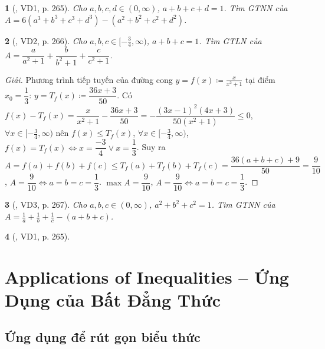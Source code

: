 \documentclass{article}
\newtheorem{baitoan}{}
\begin{document}
\begin{baitoan}[\cite{Khai_Huong_bdt}, VD1, p. 265]
	Cho $a,b,c,d\in(0,\infty)$, $a + b + c + d = 1$. Tìm {\rm GTNN} của $A = 6(a^3 + b^3 + c^3 + d^3) - (a^2 + b^2 + c^2 + d^2)$.
\end{baitoan}

\begin{baitoan}[\cite{Khai_Huong_bdt}, VD2, p. 266]
	Cho $a,b,c\in[-\frac{3}{4},\infty)$, $a + b + c = 1$. Tìm {\rm GTLN} của $A = \dfrac{a}{a^2 + 1} + \dfrac{b}{b^2 + 1} + \dfrac{c}{c^2 + 1}$.
\end{baitoan}

\begin{proof}[Giải]
	Phương trình tiếp tuyến của đường cong $y = f(x)\coloneqq\frac{x}{x^2 + 1}$ tại điểm $x_0 = \dfrac{1}{3}$: $y = T_f(x)\coloneqq\dfrac{36x + 3}{50}$. Có $f(x) - T_f(x) = \dfrac{x}{x^2 + 1} - \dfrac{36x + 3}{50} = -\dfrac{(3x - 1)^2(4x + 3)}{50(x^2 + 1)}\le0$, $\forall x\in[-\frac{3}{4},\infty)$ nên $f(x)\le T_f(x)$, $\forall x\in[-\frac{3}{4},\infty)$, $f(x) = T_f(x)\Leftrightarrow x = \dfrac{-3}{4}\lor x = \dfrac{1}{3}$. Suy ra $A = f(a) + f(b) + f(c)\le T_f(a) + T_f(b) + T_f(c) = \dfrac{36(a + b + c) + 9}{50} = \dfrac{9}{10}$, $A = \dfrac{9}{10}\Leftrightarrow a = b = c = \dfrac{1}{3}$. $\max A = \dfrac{9}{10}$, $A = \dfrac{9}{10}\Leftrightarrow a = b = c = \dfrac{1}{3}$.
\end{proof}

\begin{baitoan}[\cite{Khai_Huong_bdt}, VD3, p. 267]
	Cho $a,b,c\in(0,\infty)$, $a^2 + b^2 + c^2 = 1$. Tìm {\rm GTNN} của $A = \frac{1}{a} + \frac{1}{b} + \frac{1}{c} - (a + b + c)$.
\end{baitoan}

\begin{baitoan}[\cite{Khai_Huong_bdt}, VD1, p. 265]
	
\end{baitoan}


\section{Applications of Inequalities -- Ứng Dụng của Bất Đẳng Thức}

\subsection{Ứng dụng để rút gọn biểu thức}
\end{document}
